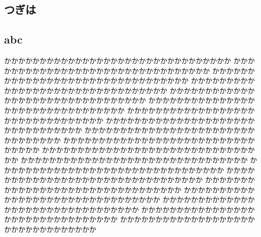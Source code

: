 \documentclass{jbook}
\begin{document}
\begin{nomarginparseprule}
\chapter{つぎは}
\section{abc}
\mbox{}
\end{nomarginparseprule}
かかかかかかかかかかかかかかかかかかかかかかかかかかかかかかかか
かかかかかかかかかかかかかかかかかかかかかかかかかかかかかかかか
かかかかかかかかかかかかかかかかかかかかかかかかかかかかかかかか
かかかかかかかかかかかかかかかかかかかかかかかかかかかかかかかか
かかかかかかかかかかかかかかかかかかかかかかかかかかかかかかかか
かかかかかかかかかかかかかかかかかかかかかかかかかかかかかかかか
かかかかかかかかかかかかかかかかかかかかかかかかかかかかかかかか
かかかかかかかかかかかかかかかかかかかかかかかかかかかかかかかか
かかかかかかかかかかかかかかかかかかかかかかかかかかかかかかかか
かかかかかかかかかかかかかかかかかかかかかかかかかかかかかかかか
かかかかかかかかかかかかかかかかかかかかかかかかかかかかかかかか
かかかかかかかかかかかかかかかかかかかかかかかかかかかかかかかか
かかかかかかかかかかかかかかかかかかかかかかかかかかかかかかかか
かかかかかかかかかかかかかかかかかかかかかかかかかかかかかかかか
かかかかかかかかかかかかかかかかかかかかかかかかかかかかかかかか
かかかかかかかかかかかかかかかかかかかかかかかかかかかかかかかか
かかかかかかかかかかかかかかかかかかかかかかかかかかかかかかかか
かかかかかかかかかかかかかかかかかかかかかかかかかかかかかかかか
かかかかかかかかかかかかかかかかかかかかかかかかかかかかかかかか
\end{document}
